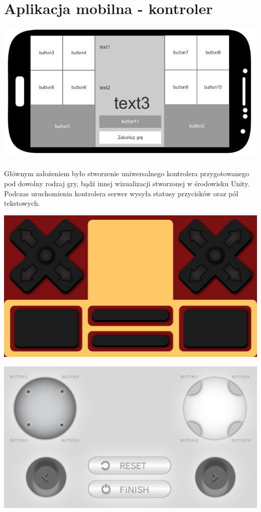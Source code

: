 \section{Aplikacja mobilna - kontroler}

\begin{center}
\includegraphics[width=1\textwidth]{images/button_mockup.png}
\end{center}
\paragraph{}
Głównym założeniem było stworzenie uniwersalnego kontrolera przygotowanego pod dowolny rodzaj gry, bądź innej wizualizacji stworzonej w środowisku Unity. Podczas uruchomienia kontrolera serwer wysyła statusy przycisków oraz pól tekstowych.


\begin{center}
\includegraphics[width=1\textwidth]{images/graph1.png}

\includegraphics[width=1\textwidth]{images/graph2.png}
\end{center}

